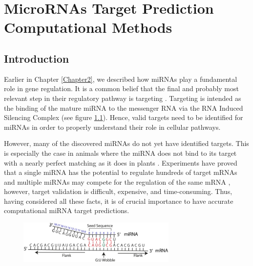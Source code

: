 
\chapter{MicroRNAs Target Prediction Computational Methods} %

\label{Chapter3} %



\section{Introduction}
Earlier in Chapter \ref{Chapter2}, we described how miRNAs play a fundamental role in gene regulation. It is a common belief that the final and probably most relevant step in their regulatory pathway is targeting \cite{computational_methods}. Targeting is intended as the binding of the mature miRNA to the messenger RNA via the RNA Induced Silencing Complex (see figure \ref{fig:mirna_binding}). Hence, valid targets need to be identified for miRNAs in order to properly understand their role in cellular pathways. 

However, many of the discovered miRNAs do not yet have identified targets. This is especially the case in animals where the miRNA does not bind to its target with a nearly perfect matching as it does in plants \cite{perfect_matching}. Experiments have proved that a single miRNA has the potential to regulate hundreds of target mRNAs and multiple miRNAs may compete for the regulation of the same mRNA \cite{multiple_binds}, however, target validation is difficult, expensive, and time-consuming. Thus, having considered all these facts, it is of crucial importance to have accurate computational miRNA target predictions.

\begin{figure}[hbt!]
	\centering
	\includegraphics[width=0.7\textwidth]{Figures/seed_match}
	\caption{}
	\label{fig:mirna_binding}
\end{figure}


